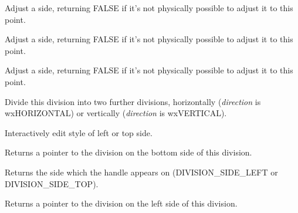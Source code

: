 

Adjust a side, returning FALSE if it's not physically possible to adjust it to this point.



Adjust a side, returning FALSE if it's not physically possible to adjust it to this point.



Adjust a side, returning FALSE if it's not physically possible to adjust it to this point.

\label{wxdivisionshapedivide}


Divide this division into two further divisions, horizontally ({\it direction} is wxHORIZONTAL) or
vertically ({\it direction} is wxVERTICAL).



Interactively edit style of left or top side.



Returns a pointer to the division on the bottom side of this division.



Returns the side which the handle appears on (DIVISION\_SIDE\_LEFT or DIVISION\_SIDE\_TOP).



Returns a pointer to the division on the left side of this division.



